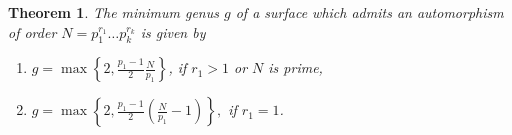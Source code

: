 \documentclass[reqno]{amsart}
\newtheorem{theorem}{Theorem}[section]
\theoremstyle{definition}
\theoremstyle{remark}
\begin{document}
\begin{theorem}
    The minimum genus $g$ of a surface which admits an automorphism of order $N= p_1^{r_1} \ldots p_k^{r_k}$ is given by
    \begin{enumerate}
        \item $g = 
        \max \left\{ 2, \frac{p_1 - 1}{2} \frac{N}{p_1} \right\}$, \quad if $r_1 > 1$ or
        $N$ is prime,
        \item $g = 
        \max \left\{
        2, \frac{p_1 - 1}{2} \left(\frac{N}{p_1} - 1  \right)
        \right\},$ \quad
        if $r_1 = 1$.
    \end{enumerate}
\end{theorem}


















\newpage
\printbibliography
\end{document}
